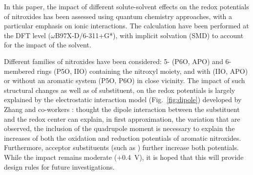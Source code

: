\documentclass[review,preprint]{elsarticle}
\begin{document}
In this paper, the impact of different solute-solvent effects on the redox potentials of nitroxides has been assessed using quantum chemistry approaches, with a particular emphasis on ionic interactions. The calculation have been performed at the DFT level ($\omega$B97X-D/6-311+G*), with implicit solvation (SMD) to account for the impact of the solvent.

Different families of nitroxides have been considered: 5- (P6O, APO) and 6-membered rings (P5O, IIO) containing the nitroxyl moiety, and with (IIO, APO) or without an aromatic system (P5O, P6O) in close vicinity. The impact of such structural changes as well as of substituent, on the redox potentials is largely explained by the electrostatic interaction model (Fig.~\ref{fig:dipole}) developed by Zhang and co-workers \cite{zhangEffectHeteroatomFunctionality2018}: thought the dipole interaction between the substituent and the redox center can explain, in first approximation, the variation that are observed, the inclusion of the quadrupole moment is necessary to explain the increases of both the oxidation and reduction potentials of aromatic nitroxides. Furthermore, acceptor substituents (such as ) further increase both potentials. While the impact remains moderate (+\SI{0.4}{\volt}), it is hoped that this will provide design rules for future investigations. 
\end{document}
